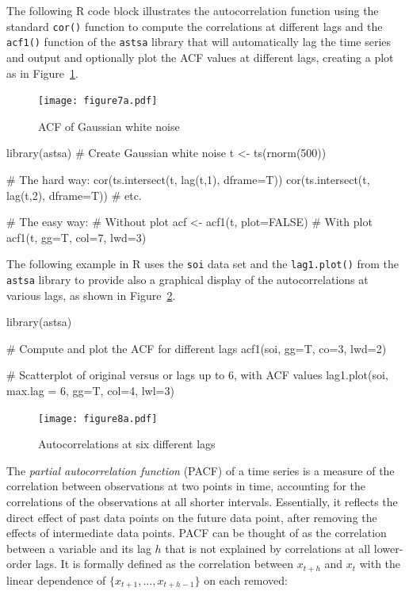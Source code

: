 The following R code block illustrates the autocorrelation function using the standard \texttt{cor()} function to compute the correlations at different lags and the \texttt{acf1()} function of the \texttt{astsa} library that will automatically lag the time series and output and optionally plot the ACF values at different lags, creating a plot as in Figure~\ref{fig:figure7a}.

\begin{figure}
\centering
\texttt{[image: figure7a.pdf]}
\caption{ACF of Gaussian white noise}
\label{fig:figure7a}
\end{figure}

\begin{samepage}
\begin{Rcode}
library(astsa)
# Create Gaussian white noise
t <- ts(rnorm(500))

# The hard way:
cor(ts.intersect(t, lag(t,1), dframe=T))
cor(ts.intersect(t, lag(t,2), dframe=T))
# etc.

# The easy way:
# Without plot
acf <- acf1(t, plot=FALSE)
# With plot
acf1(t, gg=T, col=7, lwd=3)
\end{Rcode}
\end{samepage}

The following example in R uses the \texttt{soi} data set and the \texttt{lag1.plot()} from the \texttt{astsa} library to provide also a graphical display of the autocorrelations at various lags, as shown in Figure~\ref{fig:figure8a}.

\begin{samepage}
\begin{Rcode}
library(astsa)

# Compute and plot the ACF for different lags
acf1(soi, gg=T, co=3, lwd=2)

# Scatterplot of original versus or lags up to 6, with ACF values
lag1.plot(soi, max.lag = 6, gg=T, col=4, lwl=3)
\end{Rcode}
\end{samepage}

\begin{figure}
\centering
\texttt{[image: figure8a.pdf]}
\caption{Autocorrelations at six different lags}
\label{fig:figure8a}
\end{figure}

The \emph{partial autocorrelation function} (PACF) of a time series is a measure of the correlation between observations at two points in time, accounting for the correlations of the observations at all shorter intervals. Essentially, it reflects the direct effect of past data points on the future data point, after removing the effects of intermediate data points. PACF can be thought of as the correlation between a variable and its lag $h$ that is not explained by correlations at all lower-order lags. It is formally defined as the correlation between $x_{t+h}$ and $x_t$ with the linear dependence of $\{x_{t+1}, \ldots, x_{t+h-1}\}$ on each removed:

